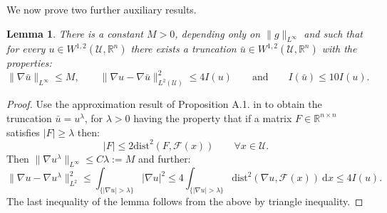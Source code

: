 \documentclass[leqno,twoside, 11pt]{amsart}
\theoremstyle{plain}
\newtheorem{lemma}[theorem]{Lemma}
\theoremstyle{definition}
\numberwithin{equation}{section}
\numberwithin{figure}{section}
\begin{document}
We now prove two further auxiliary results.

\begin{lemma}\label{lem2.3}
There is a constant $M>0$, depending only on $\|g\|_{L^\infty}$ and such that
for every $u\in W^{1,2}(\mathcal{U},\mathbb{R}^n)$ there exists a truncation
$\bar u\in W^{1,2}(\mathcal{U},\mathbb{R}^n)$ with the properties:
$$ \|\nabla\bar u\|_{L^\infty} \leq M, \qquad  
\|\nabla u - \nabla\bar u\|_{L^2(\mathcal{U})}^2\leq 4 I(u)
\qquad \mathrm{and} \qquad I(\bar u)\leq 10 I(u).$$
\end{lemma}
\begin{proof}
Use the approximation  result of Proposition A.1.
in \cite{FJMgeo} to obtain the truncation $\bar u = u^\lambda$, for $\lambda>0$
having the property that if a matrix $F\in \mathbb{R}^{n\times n}$ satisfies
$|F|\geq\lambda$ then:
$$|F|\leq 2\mbox{dist}^2(F,\mathcal{F}(x)) \qquad \forall x\in\mathcal{U}.$$
Then $\|\nabla u^\lambda\|_{L^\infty}\leq C\lambda:= M$ and further:
$$\|\nabla u - \nabla u^\lambda\|_{L^2}^2 \leq \int_{\{|\nabla u|>\lambda\}}
|\nabla u|^2 \leq 4 \int_{\{|\nabla u|>\lambda\}} 
\mbox{dist}^2(\nabla u, \mathcal{F}(x))~\mbox{d}x \leq 4 I(u).$$
The last inequality of the lemma follows from the above by triangle inequality.
\end{proof}
\end{document}
